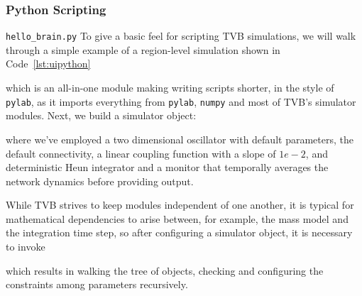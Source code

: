
\subsubsection{Python Scripting}

\texttt{hello\_brain.py}
To give a basic feel for scripting TVB simulations, we will 
walk through a simple example of a region-level simulation shown in
Code~\ref{lst:uipython}




\noindent which is an all-in-one module making writing scripts
shorter, in the style of \texttt{pylab}, as it imports everything
from \texttt{pylab}, \texttt{numpy} and most of TVB's simulator
modules. Next, we build a simulator object:


\noindent where we've employed a two dimensional oscillator
with default parameters, the default connectivity, a linear 
coupling function with a slope of $1e-2$, and deterministic
Heun integrator and a monitor that temporally averages the 
network dynamics before providing output.

While TVB strives to keep modules independent of one another,
it is typical for mathematical dependencies to arise between, 
for example, the mass model and the integration time step, so
after configuring a simulator object, it is necessary to invoke


which results in walking the tree of objects, checking and 
configuring the constraints among parameters recursively.

